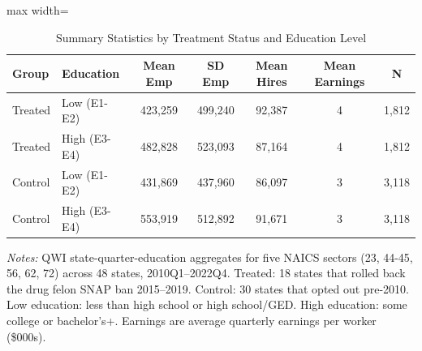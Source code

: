 \begin{table}[htbp]
\centering
\caption{Summary Statistics by Treatment Status and Education Level}
\label{tab:summary}
\begin{adjustbox}{max width=\textwidth}
\begin{tabular}{llccccc}
\toprule
Group & Education & Mean Emp & SD Emp & Mean Hires & Mean Earnings & N \\
\midrule
Treated & Low (E1-E2) & 423,259 & 499,240 & 92,387 & 4 & 1,812 \\
Treated & High (E3-E4) & 482,828 & 523,093 & 87,164 & 4 & 1,812 \\
Control & Low (E1-E2) & 431,869 & 437,960 & 86,097 & 3 & 3,118 \\
Control & High (E3-E4) & 553,919 & 512,892 & 91,671 & 3 & 3,118 \\
\bottomrule
\end{tabular}
\end{adjustbox}
\par\vspace{0.3em}
{\footnotesize \textit{Notes:} QWI state-quarter-education aggregates for five NAICS sectors (23, 44-45, 56, 62, 72) across 48 states, 2010Q1--2022Q4. Treated: 18 states that rolled back the drug felon SNAP ban 2015--2019. Control: 30 states that opted out pre-2010. Low education: less than high school or high school/GED. High education: some college or bachelor's+. Earnings are average quarterly earnings per worker (\$000s).}
\end{table}
